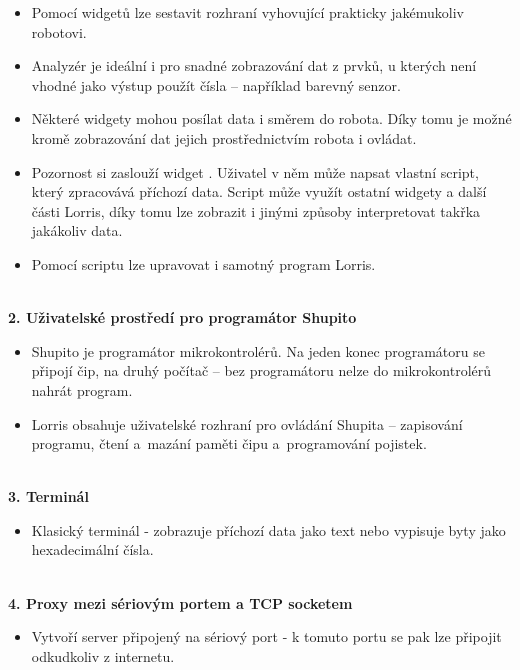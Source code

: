 \documentclass[17pt]{extreport}
\newcommand{\B}{\textbf} %
\begin{document}
\vspace{-7mm}
\begin{itemize} 
    \item Pomocí widgetů lze sestavit rozhraní vyhovující prakticky jakémukoliv robotovi.
    \item Analyzér je ideální i pro snadné zobrazování dat z prvků, u kterých není vhodné jako výstup použít čísla -- například barevný senzor.
    \item Některé widgety mohou posílat data i směrem do robota. Díky tomu je možné kromě zobrazování dat jejich prostřednictvím robota i ovládat.
    \item Pozornost si zaslouží widget . Uživatel v něm může napsat vlastní script, který zpracovává příchozí data. Script může využít ostatní widgety a další části Lorris, díky tomu lze zobrazit i jinými způsoby interpretovat takřka jakákoliv data.
    \item Pomocí scriptu lze upravovat i samotný program Lorris.
\end{itemize}
\\{\large \B{ 2. Uživatelské prostředí pro programátor Shupito }}
\begin{itemize}
    \item Shupito je programátor mikrokontrolérů. Na jeden konec programátoru se připojí čip, na druhý počítač -- bez programátoru nelze do mikrokontrolérů nahrát program.
    \item Lorris obsahuje uživatelské rozhraní pro ovládání Shupita -- zapisování programu, čtení a~mazání paměti čipu a~programování pojistek.
\end{itemize}
\\{\large \B{ 3. Terminál }}
\begin{itemize}
    \item Klasický terminál - zobrazuje příchozí data jako text nebo vypisuje byty jako hexadecimální čísla.
\end{itemize}
\\{\large \B{ 4. Proxy mezi sériovým portem a TCP socketem }}
\begin{itemize}
    \item Vytvoří server připojený na sériový port - k tomuto portu se pak lze připojit odkudkoliv z internetu.
\end{itemize}
\end{document}
